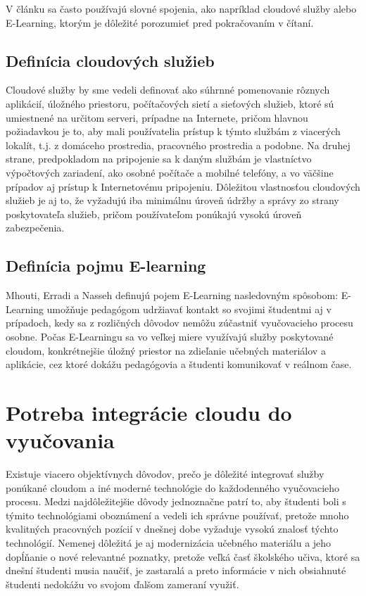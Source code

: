 \documentclass[10pt,slovak,a4paper]{article}%
\begin{document}
V článku sa často používajú slovné spojenia, ako napríklad cloudové služby alebo E-Learning, ktorým je dôležité porozumieť pred pokračovaním v čítaní.


\subsection{Definícia cloudových služieb}


Cloudové služby by sme vedeli definovať ako súhrnné pomenovanie rôznych aplikácií, úložného priestoru, počítačových sietí a sieťových služieb, ktoré sú umiestnené na určitom serveri, prípadne na Internete, pričom hlavnou požiadavkou je to, aby mali používatelia prístup k týmto službám z viacerých lokalít, t.j. z domáceho prostredia, pracovného prostredia a podobne\cite{Babu_enrichingeducation}\cite{Narkar_cloud-basededucation}. Na druhej strane, predpokladom na pripojenie sa k daným službám je vlastníctvo výpočtových zariadení, ako osobné počítače a mobilné telefóny, a vo väčšine prípadov aj prístup k Internetovému pripojeniu. Dôležitou vlastnosťou cloudových služieb je aj to, že vyžadujú iba minimálnu úroveň údržby a správy zo strany poskytovateľa služieb, pričom používateľom ponúkajú vysokú úroveň zabezpečenia\cite{Babu_enrichingeducation}.  

\subsection{Definícia pojmu E-learning}


Mhouti, Erradi a Nasseh definujú pojem E-Learning nasledovným spôsobom:  E-Learning umožňuje pedagógom udržiavať kontakt so svojimi študentmi aj v prípadoch, kedy sa z rozličných dôvodov nemôžu zúčastniť vyučovacieho procesu osobne. Počas E-Learningu sa vo veľkej miere využívajú služby poskytované cloudom, konkrétnejšie úložný priestor na zdieľanie učebných materiálov a aplikácie, cez ktoré dokážu pedagógovia a študenti komunikovať v reálnom čase.  

\section{Potreba integrácie cloudu do vyučovania}


Existuje viacero objektívnych dôvodov, prečo je dôležité integrovať služby ponúkané cloudom a iné moderné technológie do každodenného vyučovacieho procesu. Medzi najdôležitejšie dôvody jednoznačne patrí to, aby študenti boli s týmito technológiami oboznámení a vedeli ich správne používať, pretože mnoho kvalitných pracovných pozícií v dnešnej dobe vyžaduje vysokú znalosť týchto technológií\cite{Babu_enrichingeducation}. Nemenej dôležitá je aj modernizácia učebného materiálu a jeho dopĺňanie o nové relevantné poznatky, pretože veľká časť školského učiva, ktoré sa dnešní študenti musia naučiť, je zastaralá a preto informácie v nich obsiahnuté študenti nedokážu vo svojom ďalšom zameraní využiť.
\end{document}
